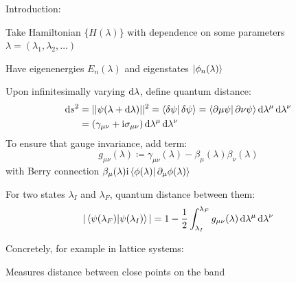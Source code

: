\documentclass[aspectratio=169]{beamer}
\begin{document}
\begin{frame}
	
	Introduction:
	
	Take Hamiltonian \(\{H(\lambda)\}\) with dependence on some parameters \(\lambda = (\lambda_1, \lambda_2, \ldots)\)
	
	Have eigenenergies \(E_n (\lambda)\) and eigenstates \(\ket{\phi_n (\lambda)}\)
	
	Upon infinitesimally varying \(\odif{\lambda}\), define quantum distance:
	\begin{align}
		\odif{s}^2 &= \vert \vert \psi (\lambda + \odif{\lambda}) \vert \vert^2 = \braket{\fdif{\psi} | \fdif{\psi}} = \braket{\pdif*{\mu} \psi | \pdif*{\nu} \psi} \odif{\lambda^{\mu}} \odif{\lambda^{\nu}} \\
		&= (\gamma_{\mu \nu} + \iu \sigma_{\mu \nu}) \odif{\lambda^{\mu}} \odif{\lambda^{\nu}}
	\end{align}
	To ensure that gauge invariance, add term:
	\begin{equation}
		g_{\mu \nu} (\lambda) \coloneqq \gamma_{\mu \nu} (\lambda) - \beta_{\mu} (\lambda) \beta_{\nu} (\lambda)
	\end{equation}
	with Berry connection \(\beta_{\mu} (\lambda) \iu \braket{\phi(\lambda) | \pdif{\mu} \phi(\lambda)}\)

	For two states \(\lambda_I\) and \(\lambda_F\), quantum distance between them:
	\begin{align}
		\vert \braket{\psi (\lambda_F) | \psi(\lambda_I)} \vert = 1 - \frac{1}{2} \int_{\lambda_I}^{\lambda_F} g_{\mu \nu} (\lambda) \odif{\lambda^{\mu}} \odif{\lambda^{\nu}}
	\end{align}
\end{frame}

\begin{frame}
	Concretely, for example in lattice systems:
	
	Measures distance between close points on the band 
\end{frame}
\end{document}
